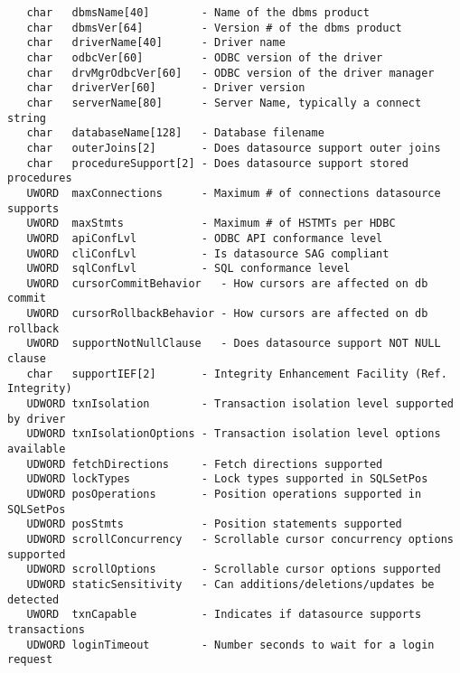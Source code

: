\begin{verbatim}
   char   dbmsName[40]        - Name of the dbms product
   char   dbmsVer[64]         - Version # of the dbms product
   char   driverName[40]      - Driver name
   char   odbcVer[60]         - ODBC version of the driver
   char   drvMgrOdbcVer[60]   - ODBC version of the driver manager
   char   driverVer[60]       - Driver version
   char   serverName[80]      - Server Name, typically a connect string
   char   databaseName[128]   - Database filename
   char   outerJoins[2]       - Does datasource support outer joins
   char   procedureSupport[2] - Does datasource support stored procedures
   UWORD  maxConnections      - Maximum # of connections datasource supports
   UWORD  maxStmts            - Maximum # of HSTMTs per HDBC
   UWORD  apiConfLvl          - ODBC API conformance level
   UWORD  cliConfLvl          - Is datasource SAG compliant
   UWORD  sqlConfLvl          - SQL conformance level
   UWORD  cursorCommitBehavior   - How cursors are affected on db commit
   UWORD  cursorRollbackBehavior - How cursors are affected on db rollback
   UWORD  supportNotNullClause   - Does datasource support NOT NULL clause
   char   supportIEF[2]       - Integrity Enhancement Facility (Ref. Integrity)
   UDWORD txnIsolation        - Transaction isolation level supported by driver
   UDWORD txnIsolationOptions - Transaction isolation level options available
   UDWORD fetchDirections     - Fetch directions supported
   UDWORD lockTypes           - Lock types supported in SQLSetPos
   UDWORD posOperations       - Position operations supported in SQLSetPos
   UDWORD posStmts            - Position statements supported
   UDWORD scrollConcurrency   - Scrollable cursor concurrency options supported
   UDWORD scrollOptions       - Scrollable cursor options supported
   UDWORD staticSensitivity   - Can additions/deletions/updates be detected
   UWORD  txnCapable          - Indicates if datasource supports transactions
   UDWORD loginTimeout        - Number seconds to wait for a login request
\end{verbatim}




